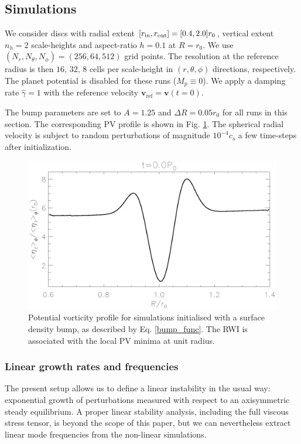 \subsection{Simulations}
We consider discs with radial extent $[r_\mathrm{in},r_\mathrm{out}]=[0.4,2.0]r_0$,
vertical extent $n_h=2$ scale-heights and aspect-ratio $h=0.1$ at
$R=r_0$. We use $(N_r, N_\theta,
N_\phi)=(256,64,512)$ grid points. 
The resolution at the reference radius is then
$16,\,32,\,8$ cells per scale-height in $(r,\theta,\phi)$ directions,
respectively. The planet potential is disabled for these runs
($M_p\equiv 0$). We apply a damping rate $\hat{\gamma}=1$ with the
reference velocity $\bm{v}_\mathrm{ref}=\bm{v}(t=0)$.     

The bump parameters are set to $A=1.25$ and $\Delta R = 0.05r_0$ for
all runs in this section.  The corresponding PV profile is shown
  in Fig. \ref{bump_PV}. The spherical radial velocity is subject 
to random perturbations of magnitude $10^{-4}c_s$ 
a few time-steps after initialization. 


\begin{figure}
  \centering
  \includegraphics[width=\linewidth]{figures/bump0_vorten1d_000}
  \caption{  Potential vorticity profile for simulations initialised
    with a surface density bump, as described by
    Eq. \ref{bump_func}. The RWI is associated with the local PV
    minima at unit radius.
    \label{bump_PV}}
\end{figure}


\subsubsection{Linear growth rates and frequencies}
The present setup allows us to define a linear instability in the
usual way: exponential growth of perturbations measured with respect
to an axisymmetric steady equilibrium. A proper linear
stability analysis, including the full viscous stress tensor, is
beyond the scope of this paper, but we can nevertheless extract linear 
mode frequencies from the non-linear simulations.  

